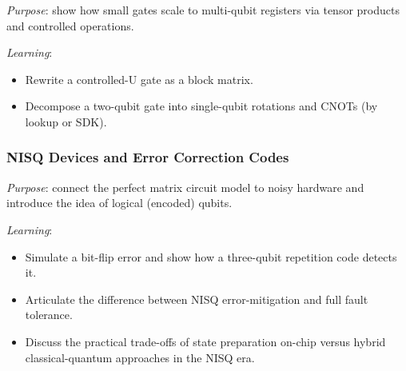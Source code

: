 \emph{Purpose}: show how small gates scale to multi-qubit registers via tensor products and controlled operations.

\emph{Learning}:
\begin{itemize}
	\item Rewrite a controlled-U gate as a block matrix.
	\item Decompose a two-qubit gate into single-qubit rotations and CNOTs (by lookup or SDK).
\end{itemize}



\subsubsection{NISQ Devices and Error Correction Codes}

\emph{Purpose}: connect the perfect matrix circuit model to noisy hardware and introduce the idea of logical (encoded) qubits.

\emph{Learning}:
\begin{itemize}
	\item Simulate a bit-flip error and show how a three-qubit repetition code detects it.
	\item Articulate the difference between NISQ error-mitigation and full fault tolerance.
	\item Discuss the practical trade-offs of state preparation on-chip versus hybrid classical-quantum approaches in the NISQ era.
\end{itemize}



